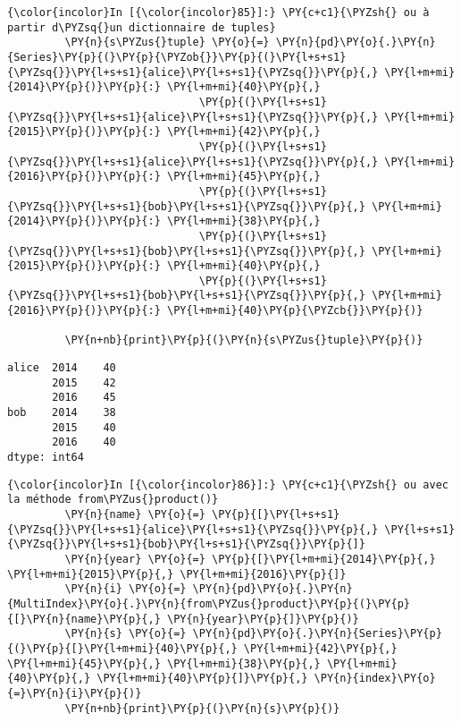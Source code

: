     \begin{Verbatim}[commandchars=\\\{\},frame=single,framerule=0.3mm,rulecolor=\color{cellframecolor}]
{\color{incolor}In [{\color{incolor}85}]:} \PY{c+c1}{\PYZsh{} ou à partir d\PYZsq{}un dictionnaire de tuples}
         \PY{n}{s\PYZus{}tuple} \PY{o}{=} \PY{n}{pd}\PY{o}{.}\PY{n}{Series}\PY{p}{(}\PY{p}{\PYZob{}}\PY{p}{(}\PY{l+s+s1}{\PYZsq{}}\PY{l+s+s1}{alice}\PY{l+s+s1}{\PYZsq{}}\PY{p}{,} \PY{l+m+mi}{2014}\PY{p}{)}\PY{p}{:} \PY{l+m+mi}{40}\PY{p}{,}
                              \PY{p}{(}\PY{l+s+s1}{\PYZsq{}}\PY{l+s+s1}{alice}\PY{l+s+s1}{\PYZsq{}}\PY{p}{,} \PY{l+m+mi}{2015}\PY{p}{)}\PY{p}{:} \PY{l+m+mi}{42}\PY{p}{,}
                              \PY{p}{(}\PY{l+s+s1}{\PYZsq{}}\PY{l+s+s1}{alice}\PY{l+s+s1}{\PYZsq{}}\PY{p}{,} \PY{l+m+mi}{2016}\PY{p}{)}\PY{p}{:} \PY{l+m+mi}{45}\PY{p}{,}
                              \PY{p}{(}\PY{l+s+s1}{\PYZsq{}}\PY{l+s+s1}{bob}\PY{l+s+s1}{\PYZsq{}}\PY{p}{,} \PY{l+m+mi}{2014}\PY{p}{)}\PY{p}{:} \PY{l+m+mi}{38}\PY{p}{,}
                              \PY{p}{(}\PY{l+s+s1}{\PYZsq{}}\PY{l+s+s1}{bob}\PY{l+s+s1}{\PYZsq{}}\PY{p}{,} \PY{l+m+mi}{2015}\PY{p}{)}\PY{p}{:} \PY{l+m+mi}{40}\PY{p}{,}
                              \PY{p}{(}\PY{l+s+s1}{\PYZsq{}}\PY{l+s+s1}{bob}\PY{l+s+s1}{\PYZsq{}}\PY{p}{,} \PY{l+m+mi}{2016}\PY{p}{)}\PY{p}{:} \PY{l+m+mi}{40}\PY{p}{\PYZcb{}}\PY{p}{)}
         
         \PY{n+nb}{print}\PY{p}{(}\PY{n}{s\PYZus{}tuple}\PY{p}{)}
\end{Verbatim}


    \begin{Verbatim}[commandchars=\\\{\},frame=single,framerule=0.3mm,rulecolor=\color{cellframecolor}]
alice  2014    40
       2015    42
       2016    45
bob    2014    38
       2015    40
       2016    40
dtype: int64
\end{Verbatim}

    \begin{Verbatim}[commandchars=\\\{\},frame=single,framerule=0.3mm,rulecolor=\color{cellframecolor}]
{\color{incolor}In [{\color{incolor}86}]:} \PY{c+c1}{\PYZsh{} ou avec la méthode from\PYZus{}product()}
         \PY{n}{name} \PY{o}{=} \PY{p}{[}\PY{l+s+s1}{\PYZsq{}}\PY{l+s+s1}{alice}\PY{l+s+s1}{\PYZsq{}}\PY{p}{,} \PY{l+s+s1}{\PYZsq{}}\PY{l+s+s1}{bob}\PY{l+s+s1}{\PYZsq{}}\PY{p}{]}
         \PY{n}{year} \PY{o}{=} \PY{p}{[}\PY{l+m+mi}{2014}\PY{p}{,} \PY{l+m+mi}{2015}\PY{p}{,} \PY{l+m+mi}{2016}\PY{p}{]}
         \PY{n}{i} \PY{o}{=} \PY{n}{pd}\PY{o}{.}\PY{n}{MultiIndex}\PY{o}{.}\PY{n}{from\PYZus{}product}\PY{p}{(}\PY{p}{[}\PY{n}{name}\PY{p}{,} \PY{n}{year}\PY{p}{]}\PY{p}{)}
         \PY{n}{s} \PY{o}{=} \PY{n}{pd}\PY{o}{.}\PY{n}{Series}\PY{p}{(}\PY{p}{[}\PY{l+m+mi}{40}\PY{p}{,} \PY{l+m+mi}{42}\PY{p}{,} \PY{l+m+mi}{45}\PY{p}{,} \PY{l+m+mi}{38}\PY{p}{,} \PY{l+m+mi}{40}\PY{p}{,} \PY{l+m+mi}{40}\PY{p}{]}\PY{p}{,} \PY{n}{index}\PY{o}{=}\PY{n}{i}\PY{p}{)}
         \PY{n+nb}{print}\PY{p}{(}\PY{n}{s}\PY{p}{)}
\end{Verbatim}


